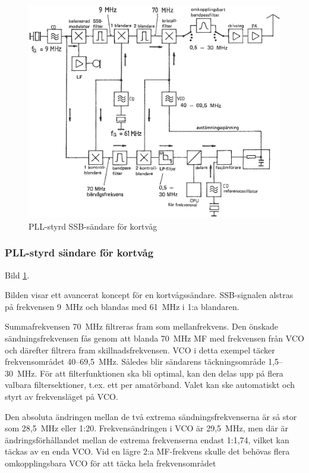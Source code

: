 \begin{figure}
  \includegraphics[width=\textwidth]{images/cropped_pdfs/bild_2_5-08.pdf}
  \caption{PLL-styrd SSB-sändare för kortvåg}
  \label{fig:bildII5-8}
\end{figure}

\subsubsection{PLL-styrd sändare för kortvåg}

Bild \ref{fig:bildII5-8}.

Bilden visar ett avancerat koncept för en kortvågssändare.
SSB-signalen alstras på frekvensen 9~MHz och blandas med 61~MHz i 1:a
blandaren.

Summafrekvensen 70~MHz filtreras fram som mellanfrekvens. Den önskade
sändningsfrekvensen fås genom att blanda 70~MHz MF med frekvensen från
VCO och därefter filtrera fram skillnadsfrekvensen.  VCO i detta
exempel täcker frekvensområdet 40--69,5~MHz. Således blir sändarens
täckningsområde 1,5--30~MHz. För att filterfunktionen ska bli
optimal, kan den delas upp på flera valbara filtersektioner, t.ex. ett
per amatörband. Valet kan ske automatiskt och styrt av frekvensläget
på VCO.

Den absoluta ändringen mellan de två extrema sändningsfrekvenserna är
så stor som 28,5~MHz eller 1:20. Frekvensändringen i VCO är 29,5~MHz,
men där är ändringsförhållandet mellan de extrema frekvenserna endast
1:1,74, vilket kan täckas av en enda VCO. Vid en lägre 2:a MF-frekvens
skulle det behövas flera omkopplingsbara VCO för att täcka hela
frekvensområdet

